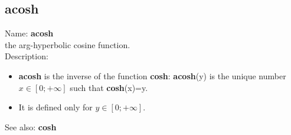 \subsection{ acosh }
\noindent Name: \textbf{acosh}\\
the arg-hyperbolic cosine function.\\

\noindent Description: \begin{itemize}

\item \textbf{acosh} is the inverse of the function \textbf{cosh}: \textbf{acosh}(y) is the unique number 
   $x \in [0; +\infty]$ such that \textbf{cosh}(x)=y.

\item It is defined only for $y \in [0;+\infty]$.
\end{itemize}
See also: \textbf{cosh}
